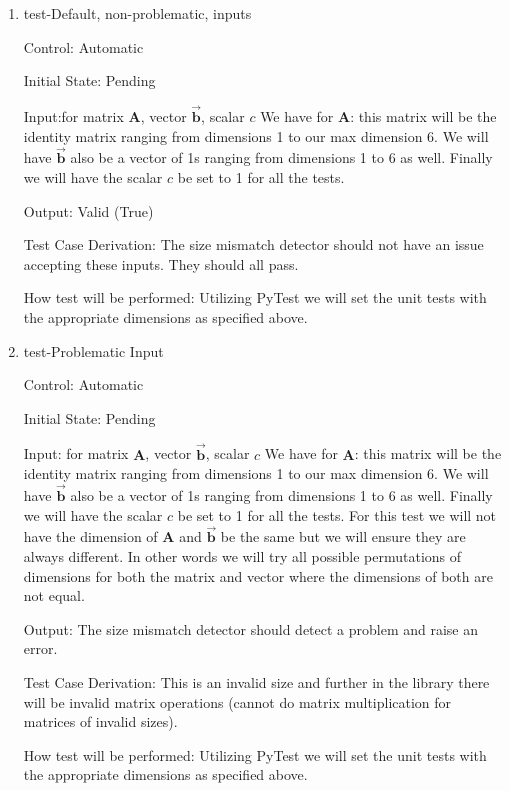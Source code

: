 \documentclass[12pt, titlepage]{article}
\begin{document}
\begin{enumerate}

\item{test-Default, non-problematic, inputs\\}

Control: Automatic
					
Initial State: Pending  
					
Input:for matrix $\mathbf{A}$, vector $\mathbf{\vec{b}}$, scalar $c$
We have for $\mathbf{A}$: this matrix will be the identity matrix ranging 
from dimensions 1 to our max dimension 6. We will have $\mathbf{\vec{b}}$
also be a vector of 1s ranging from dimensions 1 to 6 as well. Finally we 
will have the scalar $c$ be set to 1 for all the tests. 
					
Output: Valid (True)  

Test Case Derivation: The size mismatch detector should not have an issue accepting these
inputs. They should all pass. 
					
How test will be performed: Utilizing PyTest we will set the unit tests with the
appropriate dimensions as specified above. 
					
\item{test-Problematic Input\\}

Control: Automatic
					
Initial State: Pending
					
Input: for matrix $\mathbf{A}$, vector $\mathbf{\vec{b}}$, scalar $c$
We have for $\mathbf{A}$: this matrix will be the identity matrix ranging 
from dimensions 1 to our max dimension 6. We will have $\mathbf{\vec{b}}$
also be a vector of 1s ranging from dimensions 1 to 6 as well. Finally we 
will have the scalar $c$ be set to 1 for all the tests. For this test we 
will not have the dimension of $\mathbf{A}$ and $\mathbf{\vec{b}}$ be the same
but we will ensure they are always different. In other words we will try all 
possible permutations of dimensions for both the matrix and vector where the
dimensions of both are not equal.
					
Output: The size mismatch detector should detect a problem and raise an error.

Test Case Derivation: This is an invalid size and further in the library there will be invalid 
matrix operations (cannot do matrix multiplication for matrices of invalid sizes).

How test will be performed: Utilizing PyTest we will set the unit tests with the
appropriate dimensions as specified above.

\end{enumerate}
\end{document}
